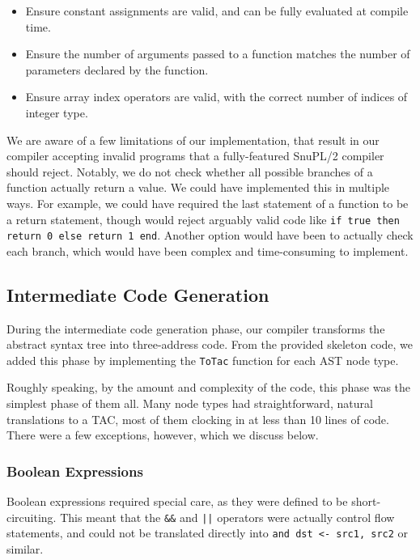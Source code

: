 \documentclass{article}
\begin{document}
\begin{itemize}
	\item Ensure constant assignments are valid, and can be fully evaluated at
	      compile time.
	\item Ensure the number of arguments passed to a function matches the number
	      of parameters declared by the function.
	\item Ensure array index operators are valid, with the correct number of
	      indices of integer type.
\end{itemize}

We are aware of a few limitations of our implementation, that result in our
compiler accepting invalid programs that a fully-featured SnuPL/2 compiler
should reject. Notably, we do not check whether all possible branches of a
function actually return a value. We could have implemented this in multiple
ways. For example, we could have required the last statement of a function to be
a return statement, though would reject arguably valid code like \texttt{if true
	then return 0 else return 1 end}. Another option would have been to actually check
each branch, which would have been complex and time-consuming to implement.

\subsection{Intermediate Code Generation}

During the intermediate code generation phase, our compiler transforms the
abstract syntax tree into three-address code. From the provided skeleton code,
we added this phase by implementing the \texttt{ToTac} function for each AST
node type.

Roughly speaking, by the amount and complexity of the code, this phase was the
simplest phase of them all. Many node types had straightforward, natural
translations to a TAC, most of them clocking in at less than 10 lines of code.
There were a few exceptions, however, which we discuss below.

\subsubsection{Boolean Expressions}

Boolean expressions required special care, as they were defined to be
short-circuiting. This meant that the \texttt{\&\&} and \texttt{||} operators
were actually control flow statements, and could not be translated directly into
\texttt{and dst <- src1, src2} or similar.
\end{document}
